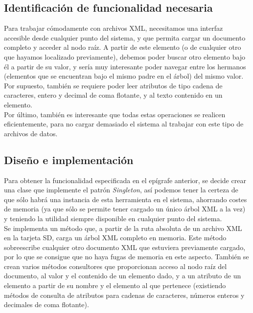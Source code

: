 \subsection{Identificación de funcionalidad necesaria}

Para trabajar cómodamente con archivos XML, necesitamos una interfaz accesible desde cualquier punto del sistema, y que permita cargar un documento completo y acceder al nodo raíz. A partir de este elemento (o de cualquier otro que hayamos localizado previamente), debemos poder buscar otro elemento bajo él a partir de su valor, y sería muy interesante poder navegar entre los hermanos (elementos que se encuentran bajo el mismo padre en el árbol) del mismo valor. Por supuesto, también se requiere poder leer atributos de tipo cadena de caracteres, entero y decimal de coma flotante, y al texto contenido en un elemento.\\

Por último, también es interesante que todas estas operaciones se realicen eficientemente, para no cargar demasiado el sistema al trabajar con este tipo de archivos de datos.

\subsection{Diseño e implementación}

Para obtener la funcionalidad especificada en el epígrafe anterior, se decide crear una clase que implemente el patrón \emph{Singleton}, así podemos tener la certeza de que sólo habrá una instancia de esta herramienta en el sistema, ahorrando costes de memoria (ya que sólo se permite tener cargado un único árbol XML a la vez) y teniendo la utilidad siempre disponible en cualquier punto del sistema.\\

Se implementa un método que, a partir de la ruta absoluta de un archivo XML en la tarjeta SD, carga un árbol XML completo en memoria. Este método sobreescribe cualquier otro documento XML que estuviera previamente cargado, por lo que se consigue que no haya fugas de memoria en este aspecto. También se crean varios métodos consultores que proporcionan acceso al nodo raíz del documento, al valor y el contenido de un elemento dado, y a un atributo de un elemento a partir de su nombre y el elemento al que pertenece (existiendo métodos de consulta de atributos para cadenas de caracteres, números enteros y decimales de coma flotante).\\

